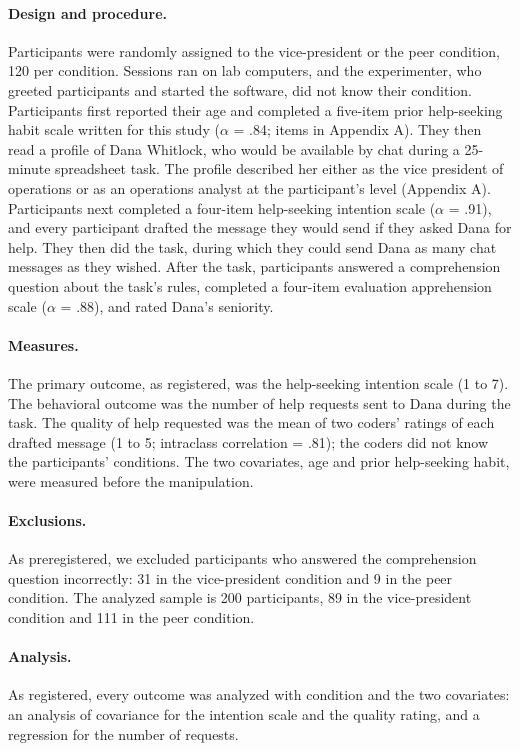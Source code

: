 \documentclass[11pt]{article}
\begin{document}
\paragraph{Design and procedure.} Participants were randomly assigned to the vice-president or the peer condition, 120 per condition. Sessions ran on lab computers, and the experimenter, who greeted participants and started the software, did not know their condition. Participants first reported their age and completed a five-item prior help-seeking habit scale written for this study ($\alpha$ = .84; items in Appendix A). They then read a profile of Dana Whitlock, who would be available by chat during a 25-minute spreadsheet task. The profile described her either as the vice president of operations or as an operations analyst at the participant's level (Appendix A). Participants next completed a four-item help-seeking intention scale ($\alpha$ = .91), and every participant drafted the message they would send if they asked Dana for help. They then did the task, during which they could send Dana as many chat messages as they wished. After the task, participants answered a comprehension question about the task's rules, completed a four-item evaluation apprehension scale ($\alpha$ = .88), and rated Dana's seniority.

\paragraph{Measures.} The primary outcome, as registered, was the help-seeking intention scale (1 to 7). The behavioral outcome was the number of help requests sent to Dana during the task. The quality of help requested was the mean of two coders' ratings of each drafted message (1 to 5; intraclass correlation = .81); the coders did not know the participants' conditions. The two covariates, age and prior help-seeking habit, were measured before the manipulation.

\paragraph{Exclusions.} As preregistered, we excluded participants who answered the comprehension question incorrectly: 31 in the vice-president condition and 9 in the peer condition. The analyzed sample is 200 participants, 89 in the vice-president condition and 111 in the peer condition.

\paragraph{Analysis.} As registered, every outcome was analyzed with condition and the two covariates: an analysis of covariance for the intention scale and the quality rating, and a regression for the number of requests.
\end{document}
